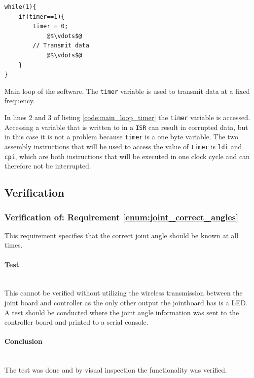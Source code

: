 {\begin{listing}[H] 
\begin{verbatim}
while(1){
    if(timer==1){ 
      	timer = 0;
      		@$\vdots$@
      	// Transmit data
			@$\vdots$@      
	}
}
\end{verbatim}
\caption{Main loop of the software. The \texttt{timer} variable is used to transmit data at a fixed frequency.} 
\label{code:main_loop_timer}
\end{listing}
In lines 2 and 3 of listing \ref{code:main_loop_timer} the \texttt{timer} variable is accessed.  
Accessing a variable that is written to in a \texttt{ISR} can result in corrupted data, but in this case it is not a problem because \texttt{timer} is a one byte variable. 
The two assembly instructions that will be used to access the value of \texttt{timer} is \texttt{ldi} and \texttt{cpi}, which are both instructions that will be executed in one clock cycle and can therefore not be interrupted.

\subsection{Verification} %
\label{sub:verification_joint_board_software}

\subsubsection{Verification of: Requirement \ref{enum:joint_correct_angles}} %
\label{ssub:requirement_enum:correct_angles}
This requirement specifies that the correct joint angle should be known at all times.

\paragraph{Test}~\\
This cannot be verified without utilizing the wireless transmission between the joint board and controller as the only other output the jointboard has is a LED.
A test should be conducted where the joint angle information was sent to the controller board and printed to a serial console.

\paragraph{Conclusion}~\\
The test was done and by visual inspection the functionality was verified.

}

